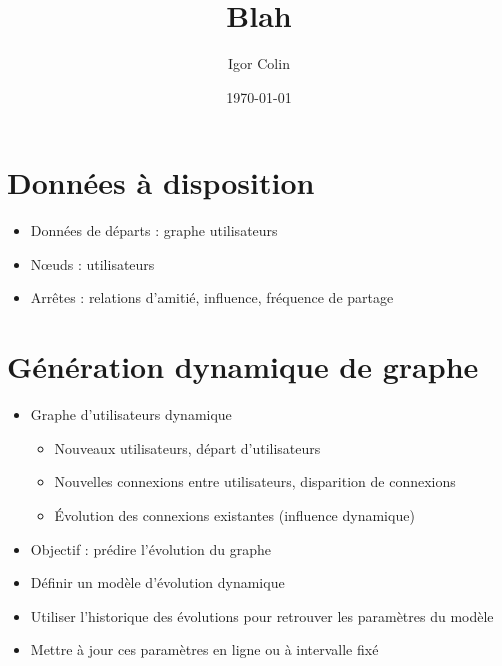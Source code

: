 \documentclass[c]{beamer}
\title{Blah}
\author{Igor Colin}
\date{\today}
\begin{document}
\maketitle

\section{Données à disposition}
\begin{frame}
    \begin{itemize}
        \item Données de départs : graphe utilisateurs
        \item N\oe{}uds : utilisateurs
        \item Arrêtes : relations d'amitié, influence, fréquence de partage

    \end{itemize}
\end{frame}

\section{Génération dynamique de graphe}
\begin{frame}
    \begin{itemize}
        \item Graphe d'utilisateurs dynamique
        \begin{itemize}
            \item Nouveaux utilisateurs, départ d'utilisateurs
            \item Nouvelles connexions entre utilisateurs, disparition de
                connexions
            \item Évolution des connexions existantes (influence dynamique)
        \end{itemize}
    \end{itemize}
\end{frame}

\begin{frame}
    \begin{itemize}
        \item Objectif : prédire l'évolution du graphe
        \item Définir un modèle d'évolution dynamique
        \item Utiliser l'historique des évolutions pour retrouver
            les paramètres du modèle
        \item Mettre à jour ces paramètres en ligne ou à intervalle fixé
    \end{itemize}
\end{frame}
\end{document}
